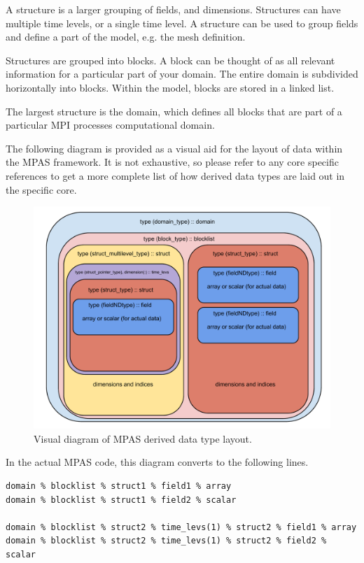 \documentclass[11pt]{report}
\begin{document}
A structure is a larger grouping of fields, and dimensions. Structures can have
multiple time levels, or a single time level. A structure can be used to group
fields and define a part of the model, e.g. the mesh definition.

Structures are grouped into blocks. A block can be thought of as all relevant
information for a particular part of your domain. The entire domain is
subdivided horizontally into blocks. Within the model, blocks are stored in a
linked list.

The largest structure is the domain, which defines all blocks that are part of
a particular MPI processes computational domain. 

The following diagram is provided as a visual aid for the layout of data within
the MPAS framework. It is not exhaustive, so please refer to any core specific
references to get a more complete list of how derived data types are laid out
in the specific core.

\begin{figure}[htp!]
	\includegraphics[scale=0.5]{figures/ddt_diagram.pdf}
	\caption{Visual diagram of MPAS derived data type layout.}
	\label{fig:ddt_diagram}
\end{figure}
\FloatBarrier


In the actual MPAS code, this diagram converts to the following lines.
{\tiny
\begin{lstlisting}
domain % blocklist % struct1 % field1 % array
domain % blocklist % struct1 % field2 % scalar

domain % blocklist % struct2 % time_levs(1) % struct2 % field1 % array
domain % blocklist % struct2 % time_levs(1) % struct2 % field2 % scalar
\end{lstlisting}
}
\end{document}
